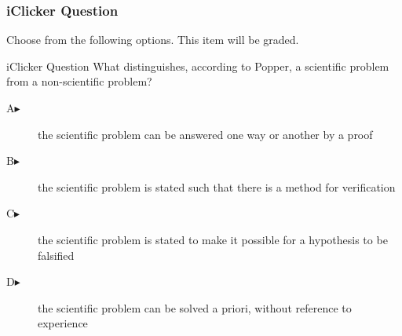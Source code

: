 \begin{frame}
  \frametitle{iClicker Question}
Choose from the following options. This item will be graded.
\begin{block}{iClicker Question}
What distinguishes, according to Popper, a scientific problem from a
non-scientific problem?
\end{block}
\begin{description}
\item[A\hspace{.2in}$\blacktriangleright$] the scientific problem can
  be answered one way or another by a proof
\item[B\hspace{.2in}$\blacktriangleright$] the scientific problem is
  stated such that there is a method for verification
\item[C\hspace{.2in}$\blacktriangleright$] the scientific problem is
  stated to make it possible for a hypothesis to be falsified
\item[D\hspace{.2in}$\blacktriangleright$] the scientific problem can
  be solved a priori, without reference to experience
\end{description}
\end{frame}
